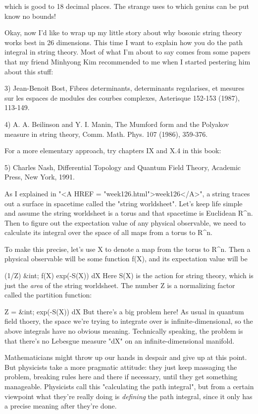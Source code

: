 which is good to 18 decimal places.  The strange uses to which genius
can be put know no bounds!  

Okay, now I'd like to wrap up my little story about why bosonic string
theory works best in 26 dimensions.  This time I want to explain how
you do the path integral in string theory.  Most of what I'm about to
say comes from some papers that my friend Minhyong Kim recommended 
to me when I started pestering him about this stuff:

3) Jean-Benoit Bost, Fibres determinants, determinants regularises, et
mesures sur les espaces de modules des courbes complexes, Asterisque
152-153 (1987), 113-149.

4) A. A. Beilinson and Y. I. Manin, The Mumford form and the Polyakov 
measure in string theory, Comm. Math. Phys. 107 (1986), 359-376.

For a more elementary approach, try chapters IX and X.4 in this book:

5) Charles Nash, Differential Topology and Quantum Field Theory, 
Academic Press, New York, 1991.


As I explained in "<A HREF = "week126.html">week126</A>", a
string traces out a surface in spacetime called the "string
worldsheet".  Let's keep life simple and assume the string
worldsheet is a torus and that spacetime is Euclidean R^{n}.
Then to figure out the expectation value of any physical observable, we
need to calculate its integral over the space of all maps from a torus
to R^{n}.


To make this precise, let's use X to denote a map from the torus to
R^{n}.  Then a physical observable will be some function f(X),
and its expectation value will be

                   (1/Z) &int; f(X) exp(-S(X)) dX
Here S(X) is the action for string theory, which is just the \emph{area} of 
the string worldsheet.  The number Z is a normalizing factor called the
partition function: 

                     Z = &int; exp(-S(X)) dX
But there's a big problem here!  As usual in quantum field thoery, the
space we're trying to integrate over is infinite-dimensional, so the
above integrals have no obvious meaning.  Technically speaking, the
problem is that there's no Lebesgue measure "dX" on an
infinite-dimensional manifold. 

Mathematicians might throw up our hands in despair and give up at this
point.  But physicists take a more pragmatic attitude: they just keep
massaging the problem, breaking rules here and there if necessary, until
they get something manageable.   Physicists call this "calculating the
path integral", but from a certain viewpoint what they're really doing
is \emph{defining} the path integral, since it only has a precise meaning
after they're done.  

